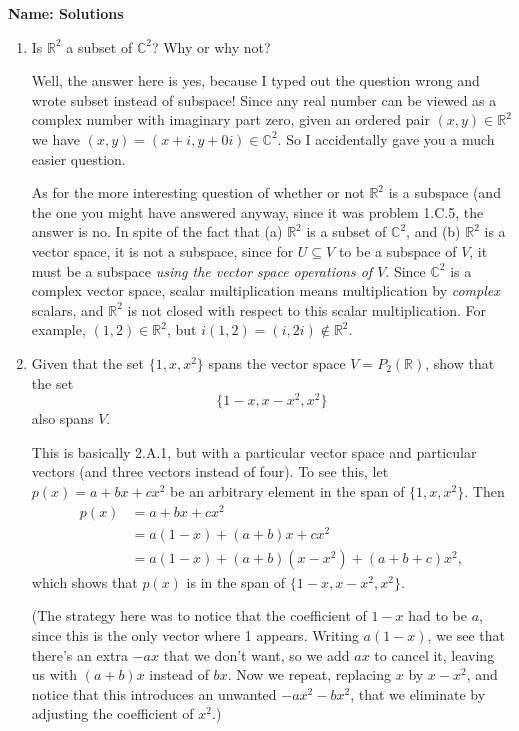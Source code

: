 \documentclass[12pt]{article}
\newcommand{\points}[1]{\marginpar{\hspace{24pt}[#1]}}
\newcommand{\R}{\mathbb{R}}
\newcommand{\C}{\mathbb{C}}
\begin{document}
\thispagestyle{fancy}
{\bf Name: Solutions}
 \begin{enumerate}
 \item  Is $\R^2$ a subset of $\C^2$? Why or why not? \points{4}

\bigskip

Well, the answer here is yes, because I typed out the question wrong and wrote subset instead of subspace! Since any real number can be viewed as a complex number with imaginary part zero, given an ordered pair $(x,y)\in\R^2$ we have $(x,y) = (x+i,y+0i)\in \C^2$. So I accidentally gave you a much easier question.

\medskip

As for the more interesting question of whether or not $\R^2$ is a subspace (and the one you might have answered anyway, since it was problem 1.C.5, the answer is no. In spite of the fact that (a) $\R^2$ is a subset of $\C^2$, and (b) $\R^2$ is a vector space, it is not a subspace, since for $U\subseteq V$ to be a subspace of $V$, it must be a subspace {\em using the vector space operations of $V$}. Since $\C^2$ is a complex vector space, scalar multiplication means multiplication by {\em complex} scalars, and $\R^2$ is not closed with respect to this scalar multiplication. For example, $(1,2)\in\R^2$, but $i(1,2) = (i,2i)\notin\R^2$.



\bigskip

 \item Given that the set $\{1,x,x^2\}$ spans the vector space $V=P_2(\R)$, show that the set \points{6}
\[
 \{1-x,x-x^2,x^2\}
\]
also spans $V$.

\bigskip

This is basically 2.A.1, but with a particular vector space and particular vectors (and three vectors instead of four). To see this, let $p(x) = a+bx+cx^2$ be an arbitrary element in the span of $\{1,x,x^2\}$. Then
\begin{align*}
p(x)&=a+bx+cx^2\\
&=a(1-x)+(a+b)x+cx^2\\
&=a(1-x)+(a+b)(x-x^2)+(a+b+c)x^2,
\end{align*}
which shows that $p(x)$ is in the span of $\{1-x,x-x^2,x^2\}$.

\medskip

(The strategy here was to notice that the coefficient of $1-x$ had to be $a$, since this is the only vector where 1 appears. Writing $a(1-x)$, we see that there's an extra $-ax$ that we don't want, so we add $ax$ to cancel it, leaving us with $(a+b)x$ instead of $bx$. Now we repeat, replacing $x$ by $x-x^2$, and notice that this introduces an unwanted $-ax^2-bx^2$, that we eliminate by adjusting the coefficient of $x^2$.)
 \end{enumerate}
\end{document}
